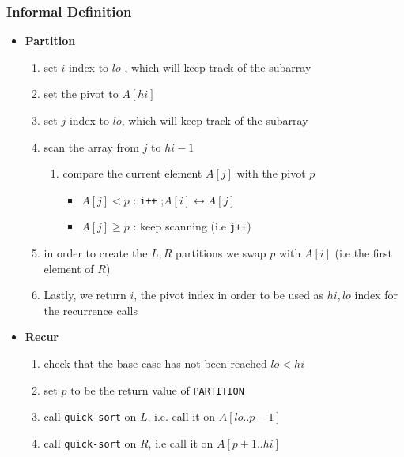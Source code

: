 
\subsubsection{Informal Definition}

\begin{itemize}
		\item\textbf{Partition}
				\begin{enumerate}
						\item set $i$ index to $lo$ , which will keep track of
								the  subarray
						\item set the pivot to $A[hi]$
						\item set $j$ index to $lo$, which will keep track of
								the  subarray
						\item scan the array from $j$ to $hi-1$
						\begin{enumerate}
								\item compare the current element $A[j]$ with
										the pivot $p$
										\begin{itemize}
												\item $A[j] < p$ : \texttt{i++}
														;$ A[i]
														\leftrightarrow A[j]$ 
												\item $A[j] \geq p$ : keep
														scanning (i.e
														\texttt{j++}) 
										\end{itemize}
						\end{enumerate}
						\item in order to create the $L, R$ partitions
								we swap $p$ with $A[i]$ (i.e the first
								element of $R$)
						\item Lastly, we return $i$, the pivot index in order to
								be used as $hi, lo$ index for the recurrence
								calls
				\end{enumerate}
		\item\textbf{Recur}
					\begin{enumerate}
							\item check that the base case has not been reached
									$lo < hi$
							\item set $p$ to be the return value of
									\texttt{PARTITION}
							\item call \texttt{quick-sort} on $L$, i.e. call it on
									$A[lo..p-1]$
							\item call \texttt{quick-sort} on $R$, i.e call it on
									$A[p+1..hi]$
					\end{enumerate}

	\end{itemize}

